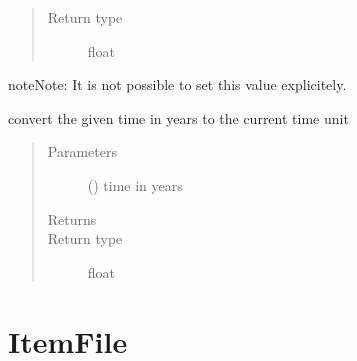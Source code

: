 \documentclass[letterpaper,10pt,english]{sphinxmanual}
\begin{document}
\begin{fulllineitems}
\begin{fulllineitems}
\begin{quote}
\begin{description}
\item[{Return type}] \leavevmode
float

\end{description}\end{quote}

\begin{sphinxadmonition}{note}{Note:}
It is not possible to set this value explicitely.
\end{sphinxadmonition}

\end{fulllineitems}


\begin{fulllineitems}
\label{\detokenize{Reference:salabim.Environment.years}}
convert the given time in years to the current time unit
\begin{quote}\begin{description}
\item[{Parameters}] \leavevmode
{} () \textendash{} time in years

\item[{Returns}] \leavevmode
{}

\item[{Return type}] \leavevmode
float

\end{description}\end{quote}

\end{fulllineitems}


\end{fulllineitems}



\section{ItemFile}
\label{\detokenize{Reference:itemfile}}
\end{document}
